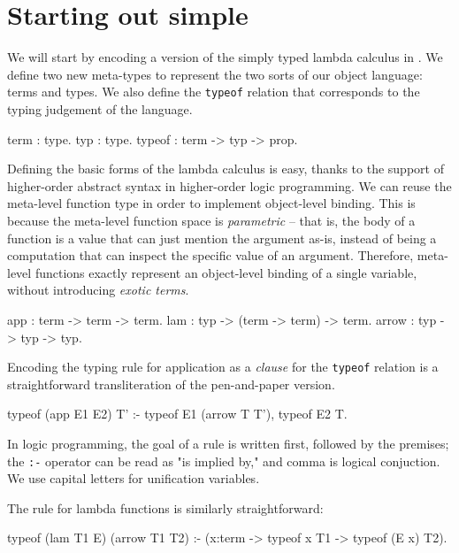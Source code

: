 \documentclass[format=acmlarge,review,anonymous]{acmart}\settopmatter{printfolios=true}
\begin{document}

\section{Starting out simple}


We will start by encoding a version of the simply typed lambda calculus in \lamprolog. We define two
new meta-types to represent the two sorts of our object language: terms and types. We also define
the \texttt{typeof} relation that corresponds to the typing judgement of the language.
\begin{codequote}
term   : type.
typ    : type.
typeof : term -> typ -> prop.
\end{codequote}

Defining the basic forms of the lambda calculus is easy, thanks to the support of higher-order
abstract syntax in higher-order logic programming. We can reuse the meta-level function type in
order to implement object-level binding. This is because the meta-level function space is
\textit{parametric} -- that is, the body of a function is a value that can just mention the argument
as-is, instead of being a computation that can inspect the specific value of an argument. Therefore,
meta-level functions exactly represent an object-level binding of a single variable, without
introducing \textit{exotic terms}.

\begin{codequote}
app    : term -> term -> term.
lam    : typ -> (term -> term) -> term.
arrow  : typ -> typ -> typ.
\end{codequote}

Encoding the typing rule for application as a \lamprolog \textit{clause} for the \texttt{typeof} relation is a
straightforward transliteration of the pen-and-paper version.

\begin{codequote}
typeof (app E1 E2) T' :-
  typeof E1 (arrow T T'),
  typeof E2 T.
\end{codequote}

In logic programming, the goal of a rule is written first, followed by the premises; the \texttt{:-}
operator can be read as "is implied by," and comma is logical conjuction. We use capital letters for
unification variables.

The rule for lambda functions is similarly straightforward: 

\begin{codequote}
typeof (lam T1 E) (arrow T1 T2) :-
  (x:term -> typeof x T1 -> typeof (E x) T2).
\end{codequote}
\end{document}

